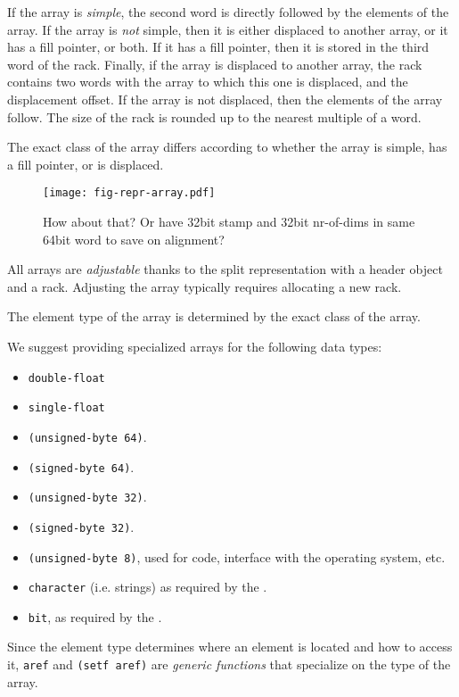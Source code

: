 If the array is \emph{simple}, the second word is directly followed
by the elements of the array.  If the array is \emph{not} simple, then
it is either displaced to another array, or it has a fill pointer, or
both.  If it has a fill pointer, then it is stored in the third word
of the rack.  Finally, if the array is displaced to another
array, the rack contains two words with the array to which
this one is displaced, and the displacement offset.  If the array is
not displaced, then the elements of the array follow.  The size of the
rack is rounded up to the nearest multiple of a word.

The exact class of the array differs according to whether the array is
simple, has a fill pointer, or is displaced.

\begin{figure}
\begin{center}
  \texttt{[image: fig-repr-array.pdf]}
\end{center}
\caption{How about that? Or have 32bit stamp and 32bit nr-of-dims in same 64bit 
  word to save on alignment?}
\end{figure}


All arrays are \emph{adjustable} thanks to the split representation
with a header object and a rack.  Adjusting the array
typically requires allocating a new rack.

The element type of the array is determined by the exact class of the
array.

We suggest providing specialized arrays for the following data types:

\begin{itemize}
\item \texttt{double-float}
\item \texttt{single-float}
\item \texttt{(unsigned-byte 64)}.
\item \texttt{(signed-byte 64)}.
\item \texttt{(unsigned-byte 32)}.
\item \texttt{(signed-byte 32)}.
\item \texttt{(unsigned-byte 8)}, used for code, interface with the
  operating system, etc.
\item \texttt{character} (i.e. strings) as required by the \hs{}.
\item \texttt{bit}, as required by the \hs{}.
\end{itemize}

Since the element type determines where an element is located and how
to access it, \texttt{aref} and \texttt{(setf aref)} are \emph{generic
  functions} that specialize on the type of the array.

